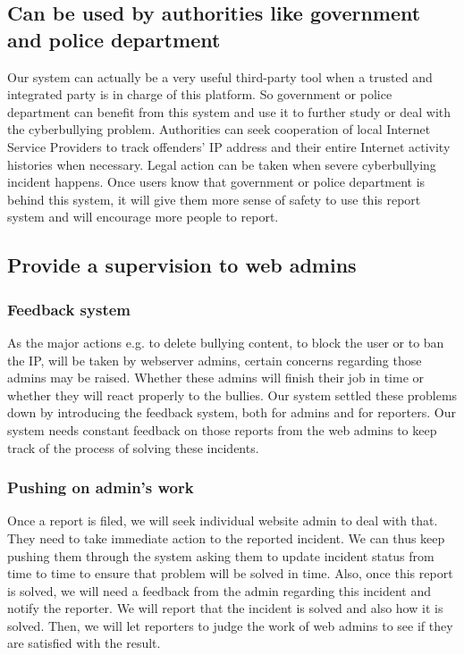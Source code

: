 \subsection{Can be used by authorities like government and police department}
Our system can actually be a very useful third-party tool when a trusted and integrated party is in charge of this platform. So government or police department can benefit from this system and use it to further study or deal with the cyberbullying problem. Authorities can seek cooperation of local Internet Service Providers to track offenders’ IP address and their entire Internet activity histories when necessary. Legal action can be taken when severe cyberbullying incident happens. Once users know that government or police department is behind this system, it will give them more sense of safety to use this report system and will encourage more people to report. 

\subsection{Provide a supervision to web admins}
\subsubsection{Feedback system}
As the major actions e.g. to delete bullying content, to block the user or to ban the IP, will be taken by webserver admins, certain concerns regarding those admins may be raised. Whether these admins will finish their job in time or whether they will react properly to the bullies. Our system settled these problems down by introducing the feedback system, both for admins and for reporters. Our system needs constant feedback on those reports from the web admins to keep track of the process of solving these incidents.

\subsubsection{Pushing on admin’s work}
Once a report is filed, we will seek individual website admin to deal with that. They need to take immediate action to the reported incident. We can thus keep pushing them through the system asking them to update incident status from time to time to ensure that problem will be solved in time. Also, once this report is solved, we will need a feedback from the admin regarding this incident and notify the reporter. We will report that the incident is solved and also how it is solved. Then, we will let reporters to judge the work of web admins to see if they are satisfied with the result.  

